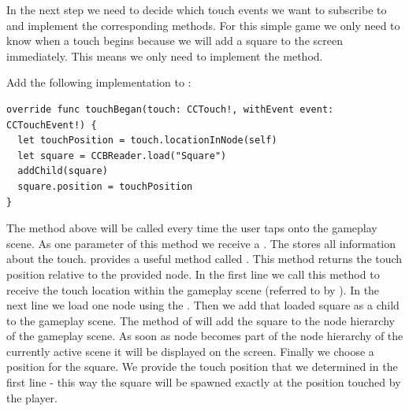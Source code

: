 In the next step we need to decide which touch events we
want to subscribe to and implement the corresponding methods. For this simple
game we only need to know when a touch begins because we will add a square to the
screen immediately. This means we only need to implement the
 method. 

\begin{leftbar}
Add the following implementation to
:
\begin{lstlisting}
override func touchBegan(touch: CCTouch!, withEvent event: CCTouchEvent!) {
  let touchPosition = touch.locationInNode(self)
  let square = CCBReader.load("Square")
  addChild(square)
  square.position = touchPosition
}
\end{lstlisting}
\end{leftbar}

The  method above will be called
every time the user taps onto the gameplay scene. As one parameter of this
method we receive a . The  stores all
information about the touch. \cocos{} provides a useful method called
. This method returns the touch position
relative to the provided node. In the first line we call this method to receive
the touch location within the gameplay scene (referred to by ).
In the next line we load one  node using the
. Then we add that loaded square as a child to the
gameplay scene. The  method of \ccnode{} will add the
square to the node hierarchy of the gameplay scene. As soon as node becomes part
of the node hierarchy of the currently active scene it will be displayed on the
screen. Finally we choose a position for the square.
We provide the touch position that we determined in the first line - this way the square will be spawned exactly at the position touched by
the player. 

